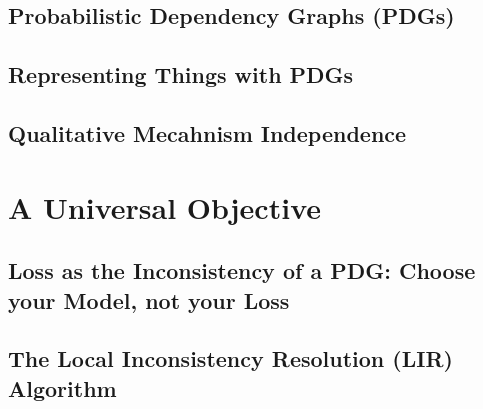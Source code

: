 \documentclass[tocprelim,
    ]{cornellmodified}
\begin{document}
\chapter{Probabilistic Dependency Graphs (PDGs)} 
    
    
\chapter{Representing Things with PDGs}
    
     
\chapter{Qualitative Mecahnism Independence}
    

\part{A Universal Objective} \label{part:univ-objective}

\chapter{Loss as the Inconsistency of a PDG: 
    Choose your Model, not your Loss}
    
\chapter{ The Local Inconsistency Resolution (LIR) Algorithm }
    
    
\end{document}

